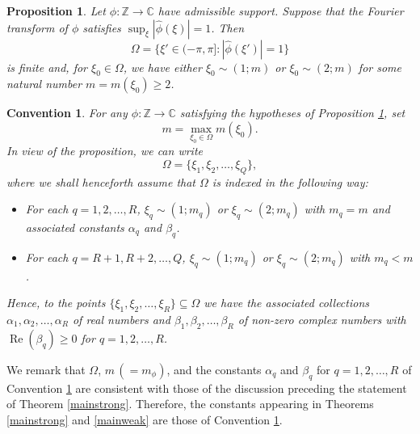 \documentclass{article}
\theoremstyle{theorem}
\newtheorem{proposition}[theorem]{Proposition}
\newtheorem{convention}[theorem]{Convention}
\theoremstyle{remark}
\renewcommand\Re{\operatorname{Re}}%
\begin{document}
\begin{proposition}\label{typesprop}
Let $\phi:\mathbb{Z}\rightarrow\mathbb{C}$ have admissible support.
Suppose that the Fourier transform of $\phi$
satisfies $\sup_{\xi}|\hat{\phi}(\xi)|=1$. Then 
\begin{equation*}
\Omega=\{\xi'\in(-\pi,\pi]:|\hat\phi(\xi')|=1\}
\end{equation*}
is finite and, for $\xi_0\in\Omega$, we have either
$\xi_0\sim(1;m)$ or $\xi_0\sim(2;m)$ for some natural number $m=m(\xi_0)\geq 2$.
\end{proposition}

\begin{convention}\label{constantsconvention}
For any $\phi:\mathbb{Z}\rightarrow\mathbb{C}$ satisfying the hypotheses of Proposition \ref{typesprop}, set
\begin{equation}\label{mdef}
m=\max_{\xi_0\in\Omega}m(\xi_0).
\end{equation}
In view of the proposition, we can write
\begin{equation*}
\Omega=\{\xi_1,\xi_2,\dots,\xi_Q\},
\end{equation*}
where we shall henceforth assume that $\Omega$ is indexed in the following way:
\begin{itemize}
\item  For each $q=1,2,\dots, R$, $\xi_q\sim(1;m_q)$ or $\xi_q\sim (2;m_q)$ with $m_q=m$ and associated constants $\alpha_q$ and $\beta_q$. 
\item  For each $q=R+1,R+2,\dots, Q$, $\xi_q\sim (1;m_q)$ or $\xi_q\sim (2;m_q)$ with $m_q<m$.
\end{itemize}
Hence, to the points $\{\xi_1,\xi_2,\dots,\xi_R\}\subseteq \Omega$ we have the associated collections $\alpha_1,\alpha_2,\dots,\alpha_R$ of real numbers and $\beta_1,\beta_2,\dots,\beta_R$ of non-zero complex numbers with $\Re(\beta_q)\geq 0$ for $q=1,2,\dots,R$.
\end{convention}
\noindent We remark that $\Omega$, $m\,(=m_\phi)$, and the constants $\alpha_q$ and $\beta_q$ for $q=1,2,\dots,R$ of Convention \ref{constantsconvention} are consistent with those of the discussion preceding the statement of Theorem \ref{mainstrong}. Therefore, the constants appearing in Theorems \ref{mainstrong} and \ref{mainweak} are those of Convention \ref{constantsconvention}.
\end{document}
